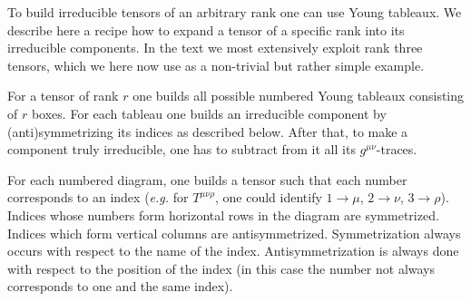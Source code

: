 \documentclass[12pt,preprintnumbers,nofootinbib]{revtex4}
\begin{document}
	To build irreducible tensors of an arbitrary rank one can use
	Young tableaux. 
	We describe here a recipe how to expand a tensor of a specific
	rank into its irreducible components.
	In the text we most extensively exploit rank three tensors, which
	we here now use as a non-trivial but rather simple example.

	For a tensor of rank $ r $ one builds all possible numbered 
	Young tableaux consisting of $ r $ boxes.
	For each tableau one builds an irreducible component by 
	(anti)symmetrizing its indices as described below.
	After that, to make a component truly irreducible, one has to 
	subtract from it all its $ g^{\mu\nu} $-traces.

	For each numbered diagram, one builds a tensor such that
	each number corresponds to an index ({\it e.g.} 
	for $ T^{\mu\nu\rho} $, one could identify $ 1 \to \mu $,  
	$ 2 \to \nu $,  $ 3 \to \rho $).
	Indices whose numbers form horizontal rows in the diagram
	are symmetrized. 
	Indices which form vertical columns are antisymmetrized.
	Symmetrization always occurs with respect to the name
	of the index.
	Antisymmetrization is always done with respect to the
	position of the index (in this case the number not always
	corresponds to one and the same index).

%	
	
\end{document}
